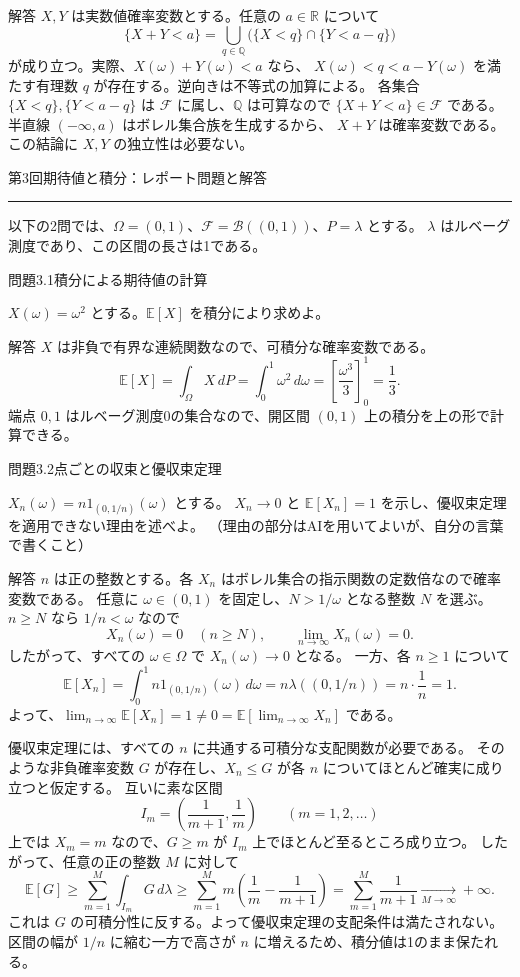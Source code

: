 \documentclass[a4paper,10pt,pdflatex,ja=standard,jafont=ipaex-type1,
  magstyle=real,scale=1]{bxjsarticle}
\newcommand{\topic}[1]{\par\vspace{5pt}
  {\large\sffamily\mdseries\color{accent}#1}\par\vspace{2pt}}
\newcommand{\handouttitle}[1]{%
  \begin{center}
    {\Large\sffamily\mdseries\color{ink}#1}\par\vspace{3mm}
    {\color{accent}\rule{0.88\linewidth}{0.7pt}}
  \end{center}\vspace{-2mm}}
\newcommand{\keybox}[1]{\par\vspace{3pt}\begingroup
  \setlength{\fboxsep}{5pt}
  \colorbox{soft}{\parbox{\dimexpr\linewidth-2\fboxsep\relax}{#1}}%
  \endgroup\par\vspace{2pt}}
\newcommand{\examplelabel}[1]{{\sffamily\mdseries\color{ink}#1}}
\newcommand{\F}{\mathcal F}
\newcommand{\R}{\mathbb R}
\newcommand{\E}{\mathbb E}
\newcommand{\ind}{\mathrm{1}}
\begin{document}
\examplelabel{解答}
$X,Y$ は実数値確率変数とする。任意の $a\in\R$ について
$$
  \{X+Y<a\}
  =\bigcup_{q\in\mathbb Q}\bigl(\{X<q\}\cap\{Y<a-q\}\bigr)
$$
が成り立つ。実際、$X(\omega)+Y(\omega)<a$ なら、
$X(\omega)<q<a-Y(\omega)$ を満たす有理数 $q$ が存在する。逆向きは不等式の加算による。
各集合 $\{X<q\},\{Y<a-q\}$ は $\F$ に属し、$\mathbb Q$ は可算なので
$\{X+Y<a\}\in\F$ である。半直線 $(-\infty,a)$ はボレル集合族を生成するから、
$X+Y$ は確率変数である。この結論に $X,Y$ の独立性は必要ない。

\clearpage
\handouttitle{第3回\quad 期待値と積分：レポート問題と解答}
以下の2問では、$\Omega=(0,1)$、$\F=\mathcal B((0,1))$、$P=\lambda$ とする。
$\lambda$ はルベーグ測度であり、この区間の長さは1である。

\topic{問題3.1\quad 積分による期待値の計算}
\keybox{$X(\omega)=\omega^2$ とする。$\E[X]$ を積分により求めよ。}

\examplelabel{解答}
$X$ は非負で有界な連続関数なので、可積分な確率変数である。
$$
  \E[X]=\int_{\Omega}X\,dP=\int_0^1\omega^2\,d\omega
  =\left[\frac{\omega^3}{3}\right]_0^1=\frac13.
$$
端点 $0,1$ はルベーグ測度0の集合なので、開区間 $(0,1)$ 上の積分を上の形で計算できる。

\topic{問題3.2\quad 点ごとの収束と優収束定理}
\keybox{$X_n(\omega)=n\ind_{(0,1/n)}(\omega)$ とする。
$X_n\to0$ と $\E[X_n]=1$ を示し、優収束定理を適用できない理由を述べよ。
（理由の部分はAIを用いてよいが、自分の言葉で書くこと）}

\examplelabel{解答}
$n$ は正の整数とする。各 $X_n$ はボレル集合の指示関数の定数倍なので確率変数である。
任意に $\omega\in(0,1)$ を固定し、$N>1/\omega$ となる整数 $N$ を選ぶ。
$n\ge N$ なら $1/n<\omega$ なので
$$
  X_n(\omega)=0\quad(n\ge N),\qquad
  \lim_{n\to\infty}X_n(\omega)=0.
$$
したがって、すべての $\omega\in\Omega$ で $X_n(\omega)\to0$ となる。
一方、各 $n\ge1$ について
$$
  \E[X_n]=\int_0^1 n\ind_{(0,1/n)}(\omega)\,d\omega
  =n\lambda((0,1/n))=n\cdot\frac1n=1.
$$
よって、$\lim_{n\to\infty}\E[X_n]=1\ne0=\E[\lim_{n\to\infty}X_n]$ である。

優収束定理には、すべての $n$ に共通する可積分な支配関数が必要である。
そのような非負確率変数 $G$ が存在し、$X_n\le G$ が各 $n$ についてほとんど確実に成り立つと仮定する。
互いに素な区間
$$
  I_m=\left(\frac1{m+1},\frac1m\right)\qquad(m=1,2,\ldots)
$$
上では $X_m=m$ なので、$G\ge m$ が $I_m$ 上でほとんど至るところ成り立つ。
したがって、任意の正の整数 $M$ に対して
$$
  \E[G]\ge\sum_{m=1}^{M}\int_{I_m}G\,d\lambda
  \ge\sum_{m=1}^{M}m\left(\frac1m-\frac1{m+1}\right)
  =\sum_{m=1}^{M}\frac1{m+1}\xrightarrow[M\to\infty]{}+\infty.
$$
これは $G$ の可積分性に反する。よって優収束定理の支配条件は満たされない。
区間の幅が $1/n$ に縮む一方で高さが $n$ に増えるため、積分値は1のまま保たれる。
\end{document}
